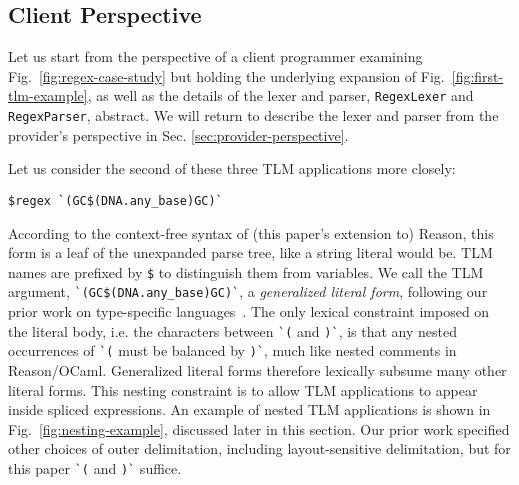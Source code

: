 \documentclass[acmsmall,screen]{acmart}
\newcommand{\li}[1]{\lstinline[basicstyle=\ttfamily\fontsize{9pt}{1em}\selectfont]{#1}}
\begin{document}
\subsection{Client Perspective}\label{sec:client-perspective}
Let us start from the perspective of a client programmer examining Fig.~\ref{fig:regex-case-study} but holding the underlying expansion of Fig.~\ref{fig:first-tlm-example}, as well as the details of the lexer and parser, \li{RegexLexer} and \li{RegexParser}, abstract. We will return to describe the lexer and parser from the provider's perspective in Sec. \ref{sec:provider-perspective}.



Let us consider the second of these three TLM applications more closely:
\begin{lstlisting}[numbers=none]
    $regex `(GC$(DNA.any_base)GC)`
\end{lstlisting}
According to the context-free syntax of (this paper's extension to) Reason, this form is a leaf of the unexpanded parse tree, like a string literal would be. TLM names are prefixed by \li{$} 
 to distinguish them from variables. We call the TLM argument, \li{`(GC$(DNA.any_base)GC)`}, a \emph{generalized literal form}, following our prior work on type-specific languages~\cite{TSLs}. The only lexical constraint imposed on the {literal body}, i.e. the characters between \li{`(} and \li{)`}, is that any nested occurrences of \li{`(} must be balanced by \li{)`}, much like nested comments in Reason/OCaml. Generalized literal forms therefore lexically subsume many other literal forms. This nesting constraint is to allow TLM applications to appear inside spliced expressions. An example of nested TLM applications is shown in Fig.~\ref{fig:nesting-example}, discussed later in this section. Our prior work \cite{TSLs} specified other choices of outer delimitation, including layout-sensitive delimitation, but for  this paper \li{`(} and \li{)`} suffice. 
\end{document}
